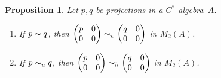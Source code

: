 \documentclass{book}
\newtheorem{proposition}[definition]{Proposition}
\def\cstar{\(C^*\)-algebra}
\begin{document}
\begin{proposition}\label{prop:528}\label{matthes:229}
  Let \(p, q\) be projections in a \cstar\ \(A\).
  \begin{enumerate}
    \item If \(p\thicksim q\), then \(\begin{pmatrix}
      p&0\\0&0
    \end{pmatrix}\thicksim_u
    \begin{pmatrix}
      q&0\\0&0
    \end{pmatrix}\) in \(M_2(A)\).
    \item If \(p\thicksim_u q\), then \(\begin{pmatrix}
      p&0\\0&0
    \end{pmatrix}\thicksim_h
    \begin{pmatrix}
      q&0\\0&0
    \end{pmatrix}\) in \(M_2(A)\).
  \end{enumerate}
\end{proposition}
\end{document}
